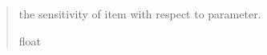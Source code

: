\documentclass[letterpaper,10pt,english]{sphinxmanual}
\begin{document}
\begin{fulllineitems}
\begin{fulllineitems}
\begin{quote}
\begin{description}
\begin{itemize}
\end{itemize}

\sphinxAtStartPar
the sensitivity of item with respect to parameter.

\sphinxAtStartPar
float

\end{description}\end{quote}

\end{fulllineitems}


\end{fulllineitems}

\end{document}
